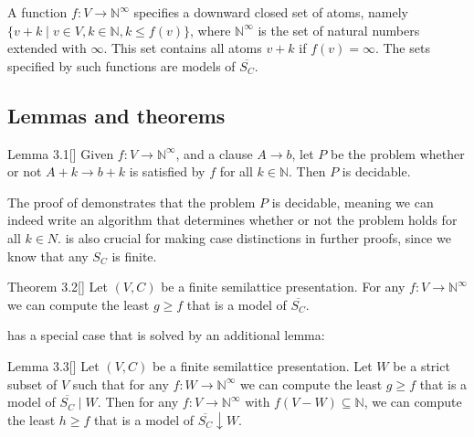 A function $f : V \rightarrow \mathbb{N}^{\infty}$ specifies a downward closed set of atoms,
namely $\{v + k \mid v \in V, k \in \mathbb{N}, k \le f(v)\}$,
where $\mathbb{N}^{\infty}$ is the set of natural numbers extended with $\infty$.
This set contains all atoms $v + k$ if $f(v) = \infty$.
The sets specified by such functions are models of $\overline{S_C}$.

\subsection{Lemmas and theorems}
\label{ssec:lemmas_and_theorems}

\begin{customlem}{Lemma 3.1}[{\cite[p.~3]{mbezem}}]
\label{lem:3.1}
Given $f : V \rightarrow \mathbb{N}^{\infty}$,
and a clause $A \rightarrow b$, let $P$ be the problem whether or not
$A + k \rightarrow b + k$ is satisfied by $f$ for all $k \in \mathbb{N}$.
Then $P$ is decidable.
\end{customlem}

The proof of  demonstrates that the problem $P$
is decidable, meaning we can indeed write an algorithm that
determines whether or not the problem holds for all $k \in N$.
 is also crucial for making case distinctions
in further proofs, since we know that any $S_C$ is finite.

\begin{customthm}{Theorem 3.2}[{\cite[p.~3]{mbezem}}]
\label{thm:3.2}
Let $(V, C)$ be a finite semilattice presentation.
For any $f : V \rightarrow \mathbb{N}^{\infty}$
we can compute the least $g \ge f$ that is a model of $\overline{S_C}$.
\end{customthm}

 has a special case that is solved by an additional lemma:

\begin{customlem}{Lemma 3.3}[{\cite[p.~3]{mbezem}}]
\label{lem:3.3}
Let $(V, C)$ be a finite semilattice presentation.
Let $W$ be a strict subset of $V$ such that for any
$f : W \rightarrow \mathbb{N}^{\infty}$ we can
compute the least $g \geq f$ that is a model of $\overline{S_C} \mid W$.
Then for any $f : V \rightarrow \mathbb{N}^{\infty}$ with $f(V - W) \subseteq \mathbb{N}$,
we can compute the least $h \geq f$ that is a model of $\overline{S_C} \downarrow W$.
\end{customlem}
